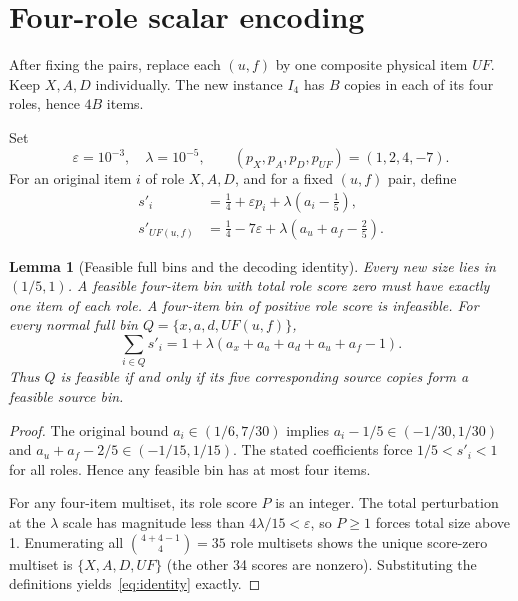\documentclass[11pt,a4paper]{article}
\newtheorem{lemma}[theorem]{Lemma}
\begin{document}
\section{Four-role scalar encoding}
After fixing the pairs, replace each $(u,f)$ by one composite physical item $UF$. Keep $X,A,D$ individually. The new instance $I_4$ has $B$ copies in each of its four roles, hence $4B$ items.

Set
\[
\varepsilon=10^{-3},\quad \lambda=10^{-5},\qquad
(p_X,p_A,p_D,p_{UF})=(1,2,4,-7).
\]
For an original item $i$ of role $X,A,D$, and for a fixed $(u,f)$ pair, define
\begin{align}
 s'_i&=\tfrac14+\varepsilon p_i+\lambda(a_i-\tfrac15),\\
 s'_{UF(u,f)}&=\tfrac14-7\varepsilon+\lambda(a_u+a_f-\tfrac25).
\end{align}

\begin{lemma}[Feasible full bins and the decoding identity]\label{lem:scalar}
Every new size lies in $(1/5,1)$. A feasible four-item bin with total role score zero must have exactly one item of each role. A four-item bin of positive role score is infeasible. For every normal full bin $Q=\{x,a,d,UF(u,f)\}$,
\begin{equation}\label{eq:identity}
 \sum_{i\in Q}s'_i=1+\lambda(a_x+a_a+a_d+a_u+a_f-1).
\end{equation}
Thus $Q$ is feasible if and only if its five corresponding source copies form a feasible source bin.
\end{lemma}
\begin{proof}
The original bound $a_i\in(1/6,7/30)$ implies $a_i-1/5\in(-1/30,1/30)$ and $a_u+a_f-2/5\in(-1/15,1/15)$. The stated coefficients force $1/5<s'_i<1$ for all roles. Hence any feasible bin has at most four items.

For any four-item multiset, its role score $P$ is an integer. The total perturbation at the $\lambda$ scale has magnitude less than $4\lambda/15<\varepsilon$, so $P\ge1$ forces total size above 1. Enumerating all $\binom{4+4-1}{4}=35$ role multisets shows the unique score-zero multiset is $\{X,A,D,UF\}$ (the other 34 scores are nonzero). Substituting the definitions yields~\eqref{eq:identity} exactly.
\end{proof}
\end{document}
